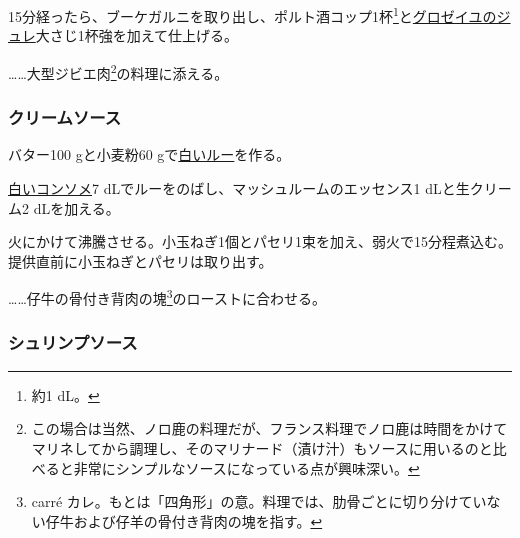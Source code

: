 \begin{recette}
15分経ったら、ブーケガルニを取り出し、ポルト酒コップ1杯\footnote{約1
  dL。}と\protect\hyperlink{}{グロゼイユのジュレ}大さじ1杯強を加えて仕上げる。

\ldots{}\ldots{}大型ジビエ肉\footnote{この場合は当然、ノロ鹿の料理だが、フランス料理でノロ鹿は時間をかけてマリネしてから調理し、そのマリナード（漬け汁）もソースに用いるのと比べると非常にシンプルなソースになっている点が興味深い。}の料理に添える。

\atoaki{}

\hypertarget{cream-sauce}{%
\subsubsection{クリームソース}\label{cream-sauce}}



バター100 gと小麦粉60
gで\protect\hyperlink{roux-blanc}{白いルー}を作る。

\protect\hyperlink{consomme-blanc}{白いコンソメ}7
dLでルーをのばし、マッシュルームのエッセンス1 dLと生クリーム2
dLを加える。

火にかけて沸騰させる。小玉ねぎ1個とパセリ1束を加え、弱火で15分程煮込む。提供直前に小玉ねぎとパセリは取り出す。

\ldots{}\ldots{}仔牛の骨付き背肉の塊\footnote{carré
  カレ。もとは「四角形」の意。料理では、肋骨ごとに切り分けていない仔牛および仔羊の骨付き背肉の塊を指す。}のローストに合わせる。

\atoaki{}

\hypertarget{shrimps-sauce}{%
\subsubsection{シュリンプソース}\label{shrimps-sauce}}



\end{recette}
